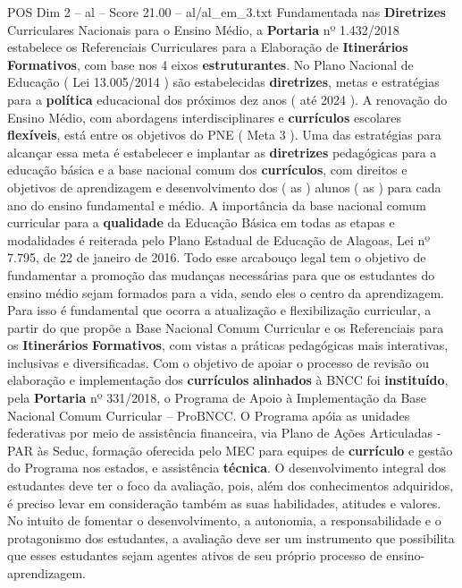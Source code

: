 \begin{textsample}{POS Dim 2 – al – Score 21.00 – al/al\_em\_3.txt}
Fundamentada nas \textbf{Diretrizes} Curriculares Nacionais para o Ensino Médio, a \textbf{Portaria} nº 1.432/2018 estabelece os Referenciais Curriculares para a Elaboração de \textbf{Itinerários} \textbf{Formativos}, com base nos 4 eixos \textbf{estruturantes}.
No Plano Nacional de Educação ( Lei 13.005/2014 ) são estabelecidas \textbf{diretrizes}, metas e estratégias para a \textbf{política} educacional dos próximos dez anos ( até 2024 ).
A renovação do Ensino Médio, com abordagens interdisciplinares e \textbf{currículos} escolares \textbf{flexíveis}, está entre os objetivos do PNE ( Meta 3 ).
Uma das estratégias para alcançar essa meta é estabelecer e implantar as \textbf{diretrizes} pedagógicas para a educação básica e a base nacional comum dos \textbf{currículos}, com direitos e objetivos de aprendizagem e desenvolvimento dos ( as ) alunos ( as ) para cada ano do ensino fundamental e médio.
A importância da base nacional comum curricular para a \textbf{qualidade} da Educação Básica em todas as etapas e modalidades é reiterada pelo Plano Estadual de Educação de Alagoas, Lei nº 7.795, de 22 de janeiro de 2016.
Todo esse arcabouço legal tem o objetivo de fundamentar a promoção das mudanças necessárias para que os estudantes do ensino médio sejam formados para a vida, sendo eles o centro da aprendizagem.
Para isso é fundamental que ocorra a atualização e flexibilização curricular, a partir do que propõe a Base Nacional Comum Curricular e os Referenciais para os \textbf{Itinerários} \textbf{Formativos}, com vistas a práticas pedagógicas mais interativas, inclusivas e diversificadas.
Com o objetivo de apoiar o processo de revisão ou elaboração e implementação dos \textbf{currículos} \textbf{alinhados} à BNCC foi \textbf{instituído}, pela \textbf{Portaria} nº 331/2018, o Programa de Apoio à Implementação da Base Nacional Comum Curricular – ProBNCC.
O Programa apóia as unidades federativas por meio de assistência financeira, via Plano de Ações Articuladas - PAR às Seduc, formação oferecida pelo MEC para equipes de \textbf{currículo} e gestão do Programa nos estados, e assistência \textbf{técnica}.
O desenvolvimento integral dos estudantes deve ter o foco da avaliação, pois, além dos conhecimentos adquiridos, é preciso levar em consideração também as suas habilidades, atitudes e valores.
No intuito de fomentar o desenvolvimento, a autonomia, a responsabilidade e o protagonismo dos estudantes, a avaliação deve ser um instrumento que possibilita que esses estudantes sejam agentes ativos de seu próprio processo de ensino-aprendizagem.

\end{textsample}
